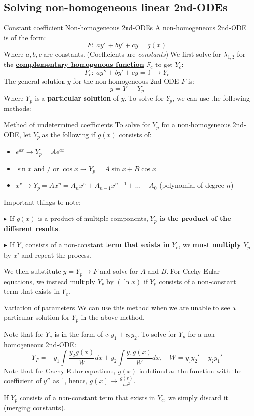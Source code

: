 \subsection{Solving non-homogeneous linear 2nd-ODEs}
\begin{definition}
    {Constant coefficient Non-homogeneous 2nd-ODEs}
    A non-homogeneous 2nd-ODE is of the form:
    \[F:\ ay''+by'+cy=g(x)\]
    Where $a,b,c$ are constants. (Coefficients are \emph{constants})
    \tcblower
    We first solve for $\lambda_{1,2}$ for the \hyperref[sec:homogeneous]{\textbf{complementary homogenous function}} $F_c$ to get $Y_c$:
    \[F_c:\ ay''+by'+cy=0\ \to Y_c\]
    The general solution $y$ for the non-homogeneous 2nd-ODE $F$ is:
    \[y=Y_c+Y_p\]
    Where $Y_p$ is a \textbf{particular solution} of $y$. To solve for $Y_p$, we can use the following methods:
\end{definition}

\begin{theorem}
    {Method of undetermined coefficients}
    To solve for $Y_p$ for a non-homogeneous 2nd-ODE, let $Y_p$ as the following if $g(x)$ consists of:
    \begin{itemize}
        \item $e^{ax}\to Y_p=Ae^{ax}$
        \item $\sin x\text{ and / or }\cos x\to Y_p=A\sin x+B\cos x$
        \item $x^n\to Y_p=Ax^n=A_nx^n+A_{n-1}x^{n-1}+\dots+A_0$ (polynomial of degree $n$)
    \end{itemize}
    Important things to note:

    $\blacktriangleright $ If $g(x)$ is a product of multiple components, \textbf{$Y_p$ is the product of the different results}.

    $\blacktriangleright $ If $Y_p$ consists of a non-constant \textbf{term that exists in $Y_c$}, we \textbf{must multiply} $Y_p$ by $x^i$ and repeat the process.


    We then substitute $y=Y_p\to F$ and solve for $A$ and $B$.
    \tcblower
    For Cachy-Eular equations, we instead multiply $Y_p$ by $(\ln x)$ if $Y_p$ consists of a non-constant term that exists in $Y_c$.
\end{theorem}

\begin{theorem}
    {Variation of parameters}
    We can use this method when we are unable to see a particular solution for $Y_p$ in the above method.

    Note that for $Y_c$ is in the form of $c_1y_1+c_2y_2$.
    To solve for $Y_p$ for a non-homogeneous 2nd-ODE:
    \[Y_{P}=-y_1\int\frac{y_2g(x)}{W}dx+y_2\int\frac{y_1g(x)}{W}dx,\quad W=y_1y_2'-y_2y_1'\]
    \tcblower
    Note that for Cachy-Eular equations, $g(x)$ is defined as the function with the coefficient of $y''$ as 1, hence, $g(x)\to \frac{g(x)}{ax^2}$.

    If $Y_p$ consists of a non-constant term that exists in $Y_c$, we simply discard it (merging constants).
\end{theorem}

